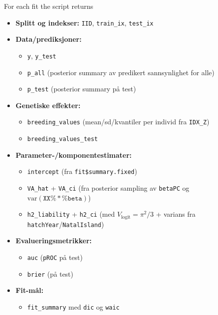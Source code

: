 



For each fit the script returns 
\begin{itemize}
  \item \textbf{Splitt og indekser:} \texttt{IID}, \texttt{train\_ix}, \texttt{test\_ix}

  \item \textbf{Data/prediksjoner:}
  \begin{itemize}
    \item \texttt{y}, \texttt{y\_test}
    \item \texttt{p\_all} (posterior summary av predikert sannsynlighet for alle)
    \item \texttt{p\_test} (posterior summary på test)
  \end{itemize}

  \item \textbf{Genetiske effekter:}
  \begin{itemize}
    \item \texttt{breeding\_values} (mean/sd/kvantiler per individ fra \texttt{IDX\_Z})
    \item \texttt{breeding\_values\_test}
  \end{itemize}

  \item \textbf{Parameter-/komponentestimater:}
  \begin{itemize}
    \item \texttt{intercept} (fra \texttt{fit\$summary.fixed})
    \item \texttt{VA\_hat} + \texttt{VA\_ci} (fra posterior sampling av \texttt{betaPC} og $\mathrm{var}(\texttt{XX} \%*\% \texttt{beta})$)
    \item \texttt{h2\_liability} + \texttt{h2\_ci} (med $V_{\text{logit}} = \pi^2/3$ + varians fra \texttt{hatchYear}/\texttt{NatalIsland})
  \end{itemize}

  \item \textbf{Evalueringsmetrikker:}
  \begin{itemize}
    \item \texttt{auc} (\texttt{pROC} på test)
    \item \texttt{brier} (på test)
  \end{itemize}

  \item \textbf{Fit-mål:}
  \begin{itemize}
    \item \texttt{fit\_summary} med \texttt{dic} og \texttt{waic}
  \end{itemize}
\end{itemize}
